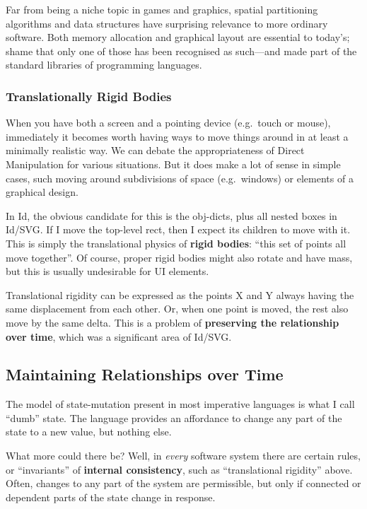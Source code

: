Far from being a niche topic in games and graphics, spatial partitioning
algorithms and data structures have surprising relevance to more
ordinary software. Both memory allocation and graphical layout are
essential to today's; shame that only one of those has been recognised
as such---and made part of the standard libraries of programming
languages.

\hypertarget{translationally-rigid-bodies}{%
\subsubsection{Translationally Rigid
Bodies}\label{translationally-rigid-bodies}}

When you have both a screen and a pointing device (e.g.~touch or mouse),
immediately it becomes worth having ways to move things around in at
least a minimally realistic way. We can debate the appropriateness of
Direct Manipulation for various situations. But it does make a lot of
sense in simple cases, such moving around subdivisions of space
(e.g.~windows) or elements of a graphical design.

In Id{}, the obvious candidate for this is the obj-dicts, plus all
nested boxes in Id{}/SVG. If I move the top-level rect, then I expect
its children to move with it. This is simply the translational physics
of \textbf{rigid bodies}: ``this set of points all move together''. Of
course, proper rigid bodies might also rotate and have mass, but this is
usually undesirable for UI elements.

Translational rigidity can be expressed as the points X and Y always
having the same displacement from each other. Or, when one point is
moved, the rest also move by the same delta. This is a problem of
\textbf{preserving the relationship over time}, which was a significant
area of Id{}/SVG.

\hypertarget{maintaining-relationships-over-time}{%
\subsection{Maintaining Relationships over
Time}\label{maintaining-relationships-over-time}}

The model of state-mutation present in most imperative languages is what
I call ``dumb'' state. The language provides an affordance to change any
part of the state to a new value, but nothing else.

What more could there be? Well, in \emph{every} software system there
are certain rules, or ``invariants'' of \textbf{internal consistency},
such as ``translational rigidity'' above. Often, changes to any part of
the system are permissible, but only if connected or dependent parts of
the state change in response.

